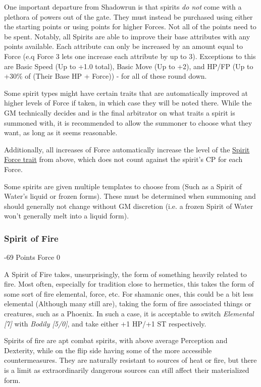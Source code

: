 \begin{multicols}{3}
	One important departure from Shadowrun is that spirits \textit{do not} come with a plethora of powers out of the gate. They must instead be purchased using either the starting points or using points for higher Forces. Not all of the points need to be spent. Notably, all Spirits are able to improve their base attributes with any points available. Each attribute can only be increased by an amount equal to Force (e.q Force 3 lets one increase each attribute by up to 3). Exceptions to this are Basic Speed (Up to +1.0 total), Basic Move (Up to +2), and HP/FP (Up to +30\% of (Their Base HP + Force)) - for all of these round down.	
	
	Some spirit types might have certain traits that are automatically improved at higher levels of Force if taken, in which case they will be noted there. While the GM technically decides and is the final arbitrator on what traits a spirit is summoned with, it is recommended to allow the summoner to choose what they want, as long as it seems reasonable.
	
	Additionally, all increases of Force automatically increase the level of the \hyperref[spirit_force]{Spirit Force trait} from above, which does not count against the spirit's CP for each Force.
	
	Some spirits are given multiple templates to choose from (Such as a Spirit of Water's liquid or frozen forms). These must be determined when summoning and should generally not change without GM discretion (i.e. a frozen Spirit of Water won't generally melt into a liquid form).
		
	\subsubsection{Spirit of Fire}
	\begin{flushright}
		-69 Points Force 0
	\end{flushright}
	
	A Spirit of Fire takes, unsurprisingly, the form of something heavily related to fire. Most often, especially for tradition close to hermetics, this takes the form of some sort of fire elemental, force, etc. For shamanic ones, this could be a bit less elemental (Although many still are), taking the form of fire associated things or creatures, such as a Phoenix. In such a case, it is acceptable to switch \textit{Elemental [7]} with \textit{Bodily [5/0]}, and take either +1 HP/+1 ST respectively.
	
	Spirits of fire are apt combat spirits, with above average Perception and Dexterity, while on the flip side having some of the more accessible countermeasures. They are naturally resistant to sources of heat or fire, but there is a limit as extraordinarily dangerous sources can still affect their materialized form.
	

\end{multicols}
